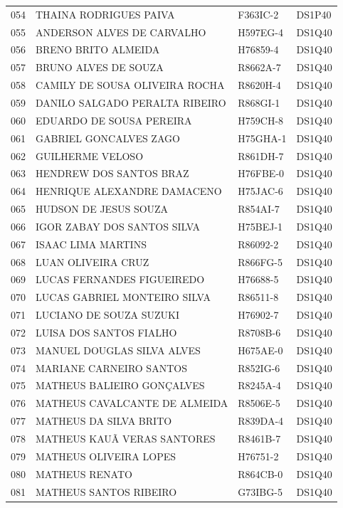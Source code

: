 \documentclass[
]{book}
\begin{document}
\begin{longtable}[]{@{}llll@{}}
054 & THAINA RODRIGUES PAIVA & F363IC-2 & DS1P40 \\
055 & ANDERSON ALVES DE CARVALHO & H597EG-4 & DS1Q40 \\
056 & BRENO BRITO ALMEIDA & H76859-4 & DS1Q40 \\
057 & BRUNO ALVES DE SOUZA & R8662A-7 & DS1Q40 \\
058 & CAMILY DE SOUSA OLIVEIRA ROCHA & R8620H-4 & DS1Q40 \\
059 & DANILO SALGADO PERALTA RIBEIRO & R868GI-1 & DS1Q40 \\
060 & EDUARDO DE SOUSA PEREIRA & H759CH-8 & DS1Q40 \\
061 & GABRIEL GONCALVES ZAGO & H75GHA-1 & DS1Q40 \\
062 & GUILHERME VELOSO & R861DH-7 & DS1Q40 \\
063 & HENDREW DOS SANTOS BRAZ & H76FBE-0 & DS1Q40 \\
064 & HENRIQUE ALEXANDRE DAMACENO & H75JAC-6 & DS1Q40 \\
065 & HUDSON DE JESUS SOUZA & R854AI-7 & DS1Q40 \\
066 & IGOR ZABAY DOS SANTOS SILVA & H75BEJ-1 & DS1Q40 \\
067 & ISAAC LIMA MARTINS & R86092-2 & DS1Q40 \\
068 & LUAN OLIVEIRA CRUZ & R866FG-5 & DS1Q40 \\
069 & LUCAS FERNANDES FIGUEIREDO & H76688-5 & DS1Q40 \\
070 & LUCAS GABRIEL MONTEIRO SILVA & R86511-8 & DS1Q40 \\
071 & LUCIANO DE SOUZA SUZUKI & H76902-7 & DS1Q40 \\
072 & LUISA DOS SANTOS FIALHO & R8708B-6 & DS1Q40 \\
073 & MANUEL DOUGLAS SILVA ALVES & H675AE-0 & DS1Q40 \\
074 & MARIANE CARNEIRO SANTOS & R852IG-6 & DS1Q40 \\
075 & MATHEUS BALIEIRO GONÇALVES & R8245A-4 & DS1Q40 \\
076 & MATHEUS CAVALCANTE DE ALMEIDA & R8506E-5 & DS1Q40 \\
077 & MATHEUS DA SILVA BRITO & R839DA-4 & DS1Q40 \\
078 & MATHEUS KAUÃ VERAS SANTORES & R8461B-7 & DS1Q40 \\
079 & MATHEUS OLIVEIRA LOPES & H76751-2 & DS1Q40 \\
080 & MATHEUS RENATO & R864CB-0 & DS1Q40 \\
081 & MATHEUS SANTOS RIBEIRO & G73IBG-5 & DS1Q40 \\

\end{longtable}
\end{document}
